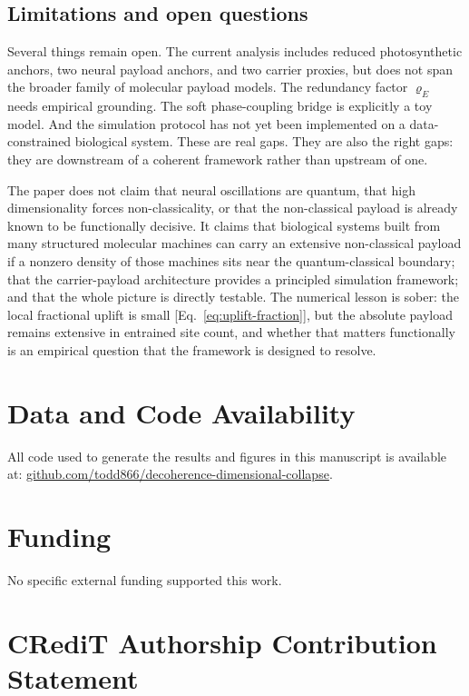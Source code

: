 \documentclass[11pt,a4paper]{article}
\theoremstyle{definition}
\theoremstyle{remark}
\begin{document}
\subsection{Limitations and open questions}

Several things remain open. The current analysis includes reduced photosynthetic anchors, two neural payload anchors, and two carrier proxies, but does not span the broader family of molecular payload models. The redundancy factor $\varrho_E$ needs empirical grounding. The soft phase-coupling bridge is explicitly a toy model. And the simulation protocol has not yet been implemented on a data-constrained biological system. These are real gaps. They are also the right gaps: they are downstream of a coherent framework rather than upstream of one.

The paper does not claim that neural oscillations are quantum, that high dimensionality forces non-classicality, or that the non-classical payload is already known to be functionally decisive. It claims that biological systems built from many structured molecular machines can carry an extensive non-classical payload if a nonzero density of those machines sits near the quantum-classical boundary; that the carrier-payload architecture provides a principled simulation framework; and that the whole picture is directly testable. The numerical lesson is sober: the local fractional uplift is small [Eq.~\eqref{eq:uplift-fraction}], but the absolute payload remains extensive in entrained site count, and whether that matters functionally is an empirical question that the framework is designed to resolve.

\section*{Data and Code Availability}

All code used to generate the results and figures in this manuscript is available at:
\href{https://github.com/todd866/decoherence-dimensional-collapse}{github.com/todd866/decoherence-dimensional-collapse}.

\section*{Funding}

No specific external funding supported this work.

\section*{CRediT Authorship Contribution Statement}
\end{document}
